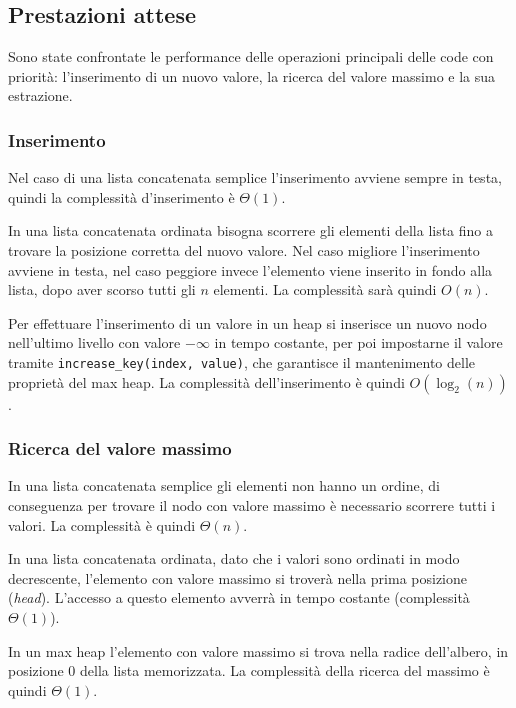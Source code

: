 \documentclass{article}
\begin{document}
\clearpage
\subsection{Prestazioni attese}

Sono state confrontate le performance delle operazioni principali delle code con priorità: l'inserimento di un nuovo valore, la ricerca del valore massimo e la sua estrazione.

\subsubsection{Inserimento}

Nel caso di una lista concatenata semplice l'inserimento avviene sempre in testa, quindi la complessità d'inserimento è $\Theta(1)$.

\vspace{5pt}
In una lista concatenata ordinata bisogna scorrere gli elementi della lista fino a trovare la posizione corretta del nuovo valore. Nel caso migliore l'inserimento avviene in testa, nel caso peggiore invece l'elemento viene inserito in fondo alla lista, dopo aver scorso tutti gli $n$ elementi. La complessità sarà quindi $O(n)$.

\vspace{5pt}
Per effettuare l'inserimento di un valore in un heap si inserisce un nuovo nodo nell'ultimo livello con valore $-\infty$ in tempo costante, per poi impostarne il valore tramite \verb|increase_key(index, value)|, che garantisce il mantenimento delle proprietà del max heap. La complessità dell'inserimento è quindi $O(\log_2(n))$.

\subsubsection{Ricerca del valore massimo}

In una lista concatenata semplice gli elementi non hanno un ordine, di conseguenza per trovare il nodo con valore massimo è necessario scorrere tutti i valori.
La complessità è quindi $\Theta(n)$.

\vspace{5pt}
In una lista concatenata ordinata, dato che i valori sono ordinati in modo decrescente, l'elemento con valore massimo si troverà nella prima posizione (\emph{head}). L'accesso a questo elemento avverrà in tempo costante (complessità $\Theta(1)$).

\vspace{5pt}
In un max heap l'elemento con valore massimo si trova nella radice dell'albero, in posizione $0$ della lista memorizzata. La complessità della ricerca del massimo è quindi $\Theta(1)$.
\end{document}
